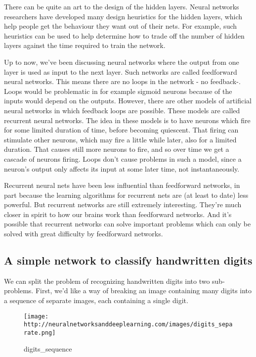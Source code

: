 \documentclass[]{article}
\begin{document}
There can be quite an art to the design of the hidden layers. Neural
networks researchers have developed many design heuristics for the
hidden layers, which help people get the behaviour they want out of
their nets. For example, such heuristics can be used to help determine
how to trade off the number of hidden layers against the time required
to train the network.

Up to now, we've been discussing neural networks where the output from
one layer is used as input to the next layer. Such networks are called
feedforward neural networks. This means there are no loops in the
network - no feedback-. Loops would be problematic in for example
sigmoid neurons because of the inputs would depend on the outputs.
However, there are other models of artificial neural networks in which
feedback loops are possible. These models are called recurrent neural
networks. The idea in these models is to have neurons which fire for
some limited duration of time, before becoming quiescent. That firing
can stimulate other neurons, which may fire a little while later, also
for a limited duration. That causes still more neurons to fire, and so
over time we get a cascade of neurons firing. Loops don't cause problems
in such a model, since a neuron's output only affects its input at some
later time, not instantaneously.

Recurrent neural nets have been less influential than feedforward
networks, in part because the learning algorithms for recurrent nets are
(at least to date) less powerful. But recurrent networks are still
extremely interesting. They're much closer in spirit to how our brains
work than feedforward networks. And it's possible that recurrent
networks can solve important problems which can only be solved with
great difficulty by feedforward networks.

\subsection{A simple network to classify handwritten
digits}\label{a-simple-network-to-classify-handwritten-digits}

We can split the problem of recognizing handwritten digits into two
sub-problems. First, we'd like a way of breaking an image containing
many digits into a sequence of separate images, each containing a single
digit.

\begin{figure}[htbp]
\centering
\texttt{[image: http://neuralnetworksanddeeplearning.com/images/digits\_separate.png]}
\caption{digits\_sequence}
\end{figure}
\end{document}
